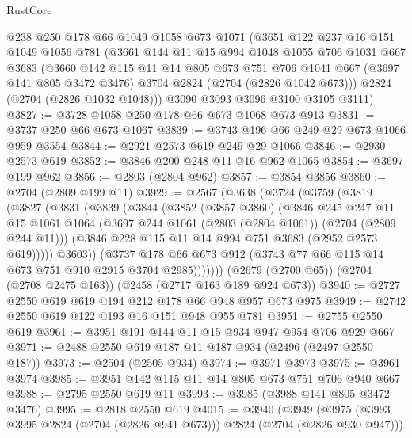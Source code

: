 \begin{lexlean}{RustCore}
\begin{coremodule}
    @238
    @250
    @178
    @66
    @1049
    @1058
    @673
    @1071
    (@3651
      @122
      @237
      @16
      @151
      @1049
      @1056
      @781
      (@3661
        @144
        @11
        @15
        @994
        @1048
        @1055
        @706
        @1031
        @667
        @3683
        (@3660
          @142
          @115
          @11
          @14
          @805
          @673
          @751
          @706
          @1041
          @667
          (@3697 @141 @805 @3472 @3476)
          @3704
          @2824
          (@2704 (@2826 @1042 @673)))
        @2824
        (@2704 (@2826 @1032 @1048)))
      @3090
      @3093
      @3096
      @3100
      @3105
      @3111)
@3827 := @3728 @1058 @250 @178 @66 @673 @1068 @673 @913
@3831 := @3737 @250 @66 @673 @1067
@3839 := @3743 @196 @66 @249 @29 @673 @1066 @959 @3554
@3844 := @2921 @2573 @619 @249 @29 @1066
@3846 := @2930 @2573 @619
@3852 := @3846 @200 @248 @11 @16 @962 @1065
@3854 := @3697 @199 @962
@3856 := @2803 (@2804 @962)
@3857 := @3854 @3856
@3860 := @2704 (@2809 @199 @11)
@3929 := @2567
    (@3638
      (@3724
        (@3759
          (@3819
            (@3827
              (@3831
                (@3839
                  (@3844
                    (@3852
                      (@3857 @3860)
                      (@3846
                        @245
                        @247
                        @11
                        @15
                        @1061
                        @1064
                        (@3697 @244 @1061 (@2803 (@2804 @1061)) (@2704 (@2809 @244 @11)))
                        (@3846 @228 @115 @11 @14 @994 @751 @3683 (@2952 @2573 @619)))))
                  @3603))
              (@3737
                @178
                @66
                @673
                @912
                (@3743 @77 @66 @115 @14 @673 @751 @910 @2915 @3704 @2985)))))))
    (@2679 (@2700 @65))
    (@2704 (@2708 @2475 @163))
    (@2458 (@2717 @163 @189 @924 @673))
@3940 := @2727 @2550 @619 @619 @194 @212 @178 @66 @948 @957 @673 @975
@3949 := @2742 @2550 @619 @122 @193 @16 @151 @948 @955 @781
@3951 := @2755 @2550 @619
@3961 := @3951 @191 @144 @11 @15 @934 @947 @954 @706 @929 @667
@3971 := @2488 @2550 @619 @187 @11 @187 @934 (@2496 (@2497 @2550 @187))
@3973 := @2504 (@2505 @934)
@3974 := @3971 @3973
@3975 := @3961 @3974
@3985 := @3951 @142 @115 @11 @14 @805 @673 @751 @706 @940 @667
@3988 := @2795 @2550 @619 @11
@3993 := @3985 (@3988 @141 @805 @3472 @3476)
@3995 := @2818 @2550 @619
@4015 := @3940
    (@3949
      (@3975 (@3993 @3995 @2824 (@2704 (@2826 @941 @673))) @2824 (@2704 (@2826 @930 @947)))

\end{coremodule}
\end{lexlean}
